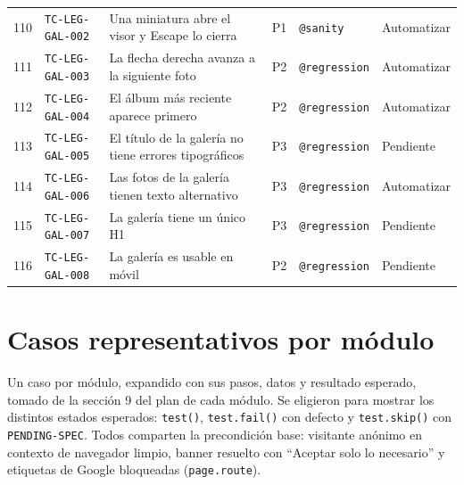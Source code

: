 \documentclass[11pt,a4paper]{article}
\newcommand{\tcid}[1]{\texttt{#1}}
\begin{document}
{\begin{xltabular}{\textwidth}{@{}r l X c l l@{}}
110 & \tcid{TC-LEG-GAL-002} & Una miniatura abre el visor y Escape lo cierra & P1 & \texttt{@sanity} & Automatizar \\
111 & \tcid{TC-LEG-GAL-003} & La flecha derecha avanza a la siguiente foto & P2 & \texttt{@regression} & Automatizar \\
112 & \tcid{TC-LEG-GAL-004} & El álbum más reciente aparece primero & P2 & \texttt{@regression} & Automatizar \\
113 & \tcid{TC-LEG-GAL-005} & El título de la galería no tiene errores tipográficos & P3 & \texttt{@regression} & Pendiente \\
114 & \tcid{TC-LEG-GAL-006} & Las fotos de la galería tienen texto alternativo & P3 & \texttt{@regression} & Automatizar \\
115 & \tcid{TC-LEG-GAL-007} & La galería tiene un único H1 & P3 & \texttt{@regression} & Pendiente \\
116 & \tcid{TC-LEG-GAL-008} & La galería es usable en móvil & P2 & \texttt{@regression} & Pendiente \\
\end{xltabular}
}

\section{Casos representativos por módulo}

Un caso por módulo, expandido con sus pasos, datos y resultado esperado, tomado de la sección 9 del
plan de cada módulo. Se eligieron para mostrar los distintos estados esperados: \texttt{test()},
\texttt{test.fail()} con defecto y \texttt{test.skip()} con \texttt{PENDING-SPEC}. Todos comparten la
precondición base: visitante anónimo en contexto de navegador limpio, banner resuelto con
``Aceptar solo lo necesario'' y etiquetas de Google bloqueadas (\texttt{page.route}).
\end{document}

